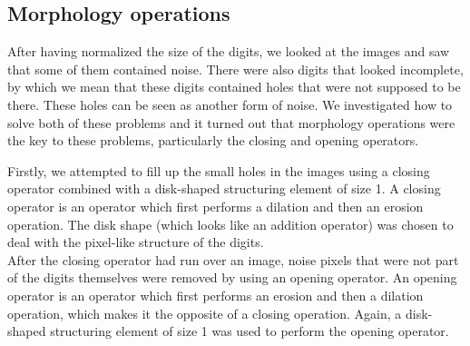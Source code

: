 \documentclass[11pt,twoside,a4paper]{article}
\begin{document}
\subsection{Morphology operations} %
After having normalized the size of the digits, we looked at the images and saw that some of them contained noise. There were also digits that looked incomplete, by which we mean that these digits contained holes that were not supposed to be there. These holes can be seen as another form of noise. We investigated how to solve both of these problems and it turned out that morphology operations were the key to these problems, particularly the closing and opening operators. %



Firstly, we attempted to fill up the small holes in the images using a closing operator combined with a disk-shaped structuring element of size 1. A closing operator is an operator which first performs a dilation and then an erosion operation. The disk shape (which looks like an addition operator) was chosen to deal with the pixel-like structure of the digits.\\
After the closing operator had run over an image, noise pixels that were not part of the digits themselves were removed by using an opening operator. An opening operator is an operator which first performs an erosion and then a dilation operation, which makes it the opposite of a closing operation. Again, a disk-shaped structuring element of size 1 was used to perform the opening operator.
\end{document}

